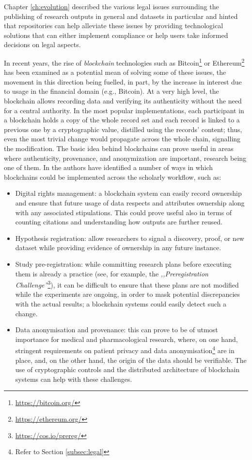 Chapter \ref{ch:evolution} described the various legal issues surrounding the publishing of research outputs in general and datasets in particular and hinted that repositories can help alleviate these issues by providing technological solutions that can either implement compliance or help users take informed decisions on legal aspects.

In recent years, the rise of \emph{blockchain} technologies such as Bitcoin\footnote{\url{https://bitcoin.org/}} or Ethereum\footnote{\url{https://ethereum.org/}}  has been examined as a potential mean of solving some of these issues, the movement in this direction being fuelled, in part, by the increase in interest due to usage in the financial domain (e.g., Bitcoin). At a very high level, the blockchain allows recording data and verifying its authenticity without the need for a central authority. In the most popular implementations, each participant in a blockchain holds a copy of the whole record set and each record is linked to a previous one by a cryptographic value, distilled using the records' content; thus, even the most trivial change would propagate across the whole chain, signalling the modification. The basic idea behind blockchains can prove useful in areas where authenticity, provenance, and anonymization are important, research being one of them. In \cite{dsbc} the authors have identified a number of ways in which blockchains could be implemented across the scholarly workflow, such as:

\begin{itemize}
    \item Digital rights management: a blockchain system can easily record ownership and ensure that future usage of data respects and attributes  ownership along with any associated stipulations. This could prove useful also in terms of counting citations and understanding how outputs are further reused.
    \item Hypothesis registration: allow researchers to signal a discovery, proof, or new dataset while providing evidence of ownership in any future instance.
    \item Study pre-registration: while committing research plans before executing them is already a practice (see, for example, the \emph{,,Preregistration Challenge''}\footnote{\url{https://cos.io/prereg/}}), it can be difficult to ensure that these plans are not modified while the experiments are ongoing, in order to mask potential discrepancies with the actual results; a blockchain systems could easily detect such a change.
    \item Data anonymisation and provenance: this can prove to be of utmost importance for medical and pharmacological research, where, on one hand, stringent requirements on patient privacy and data anonymisation\footnote{Refer to Section \ref{subsec:legal}} are in place, and, on the other hand, the origin of the data should be verifiable. The use of cryptographic controls and the distributed architecture of blockchain systems can help with these challenges.
\end{itemize}

